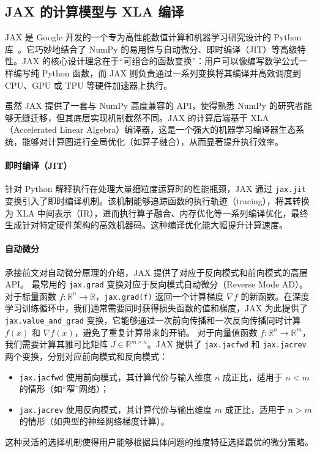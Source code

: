 \subsection{JAX 的计算模型与 XLA 编译}

JAX 是 Google 开发的一个专为高性能数值计算和机器学习研究设计的 Python 库~\cite{sapunov2024deep,lin2023automatic}。它巧妙地结合了 NumPy 的易用性与自动微分、即时编译（JIT）等高级特性。JAX 的核心设计理念在于“可组合的函数变换”：用户可以像编写数学公式一样编写纯 Python 函数，而 JAX 则负责通过一系列变换将其编译并高效调度到 CPU、GPU 或 TPU 等硬件加速器上执行。

虽然 JAX 提供了一套与 NumPy 高度兼容的 API，使得熟悉 NumPy 的研究者能够无缝迁移，但其底层实现机制截然不同。JAX 的计算后端基于 XLA（Accelerated Linear Algebra）编译器，这是一个强大的机器学习编译器生态系统，能够对计算图进行全局优化（如算子融合），从而显著提升执行效率。

\paragraph{即时编译（JIT）}
针对 Python 解释执行在处理大量细粒度运算时的性能瓶颈，JAX 通过 \texttt{jax.jit} 变换引入了即时编译机制。该机制能够追踪函数的执行轨迹（tracing），将其转换为 XLA 中间表示（IR），进而执行算子融合、内存优化等一系列编译优化，最终生成针对特定硬件架构的高效机器码。这种编译优化能大幅提升计算速度。

\paragraph{自动微分}
承接前文对自动微分原理的介绍，JAX 提供了对应于反向模式和前向模式的高层 API。
最常用的 \texttt{jax.grad} 变换对应于反向模式自动微分（Reverse Mode AD）。对于标量函数 $f: \mathbb{R}^n \to \mathbb{R}$，\texttt{jax.grad(f)} 返回一个计算梯度 $\nabla f$ 的新函数。在深度学习训练循环中，我们通常需要同时获得损失函数的值和梯度，JAX 为此提供了 \texttt{jax.value\_and\_grad} 变换，它能够通过一次前向传播和一次反向传播同时计算 $f(x)$ 和 $\nabla f(x)$，避免了重复计算带来的开销。
对于向量值函数 $f: \mathbb{R}^n \to \mathbb{R}^m$，我们需要计算其雅可比矩阵 $J \in \mathbb{R}^{m \times n}$。JAX 提供了 \texttt{jax.jacfwd} 和 \texttt{jax.jacrev} 两个变换，分别对应前向模式和反向模式：
\begin{itemize}
    \item \texttt{jax.jacfwd} 使用前向模式，其计算代价与输入维度 $n$ 成正比，适用于 $n < m$ 的情形（如“窄”网络）；
    \item \texttt{jax.jacrev} 使用反向模式，其计算代价与输出维度 $m$ 成正比，适用于 $n > m$ 的情形（如典型的神经网络梯度计算）。
\end{itemize}
这种灵活的选择机制使得用户能够根据具体问题的维度特征选择最优的微分策略。

